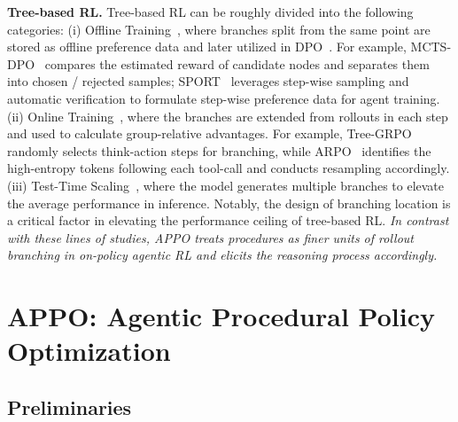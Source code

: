 \documentclass{llmxive}
\begin{document}
\noindent\textbf{Tree-based RL.}
Tree-based RL can be roughly divided into the following categories: (i) Offline Training~\cite{feng2023alphazero,lai2024step,li2025iterative,xie2024monte}, where  branches split from the same point are stored as offline preference data and later utilized in DPO~\cite{rafailov2023direct}. For example, MCTS-DPO~\cite{xie2024monte} compares the estimated reward of candidate nodes and separates them into chosen / rejected samples; SPORT~\cite{li2025iterative} leverages step-wise sampling and automatic verification to formulate step-wise preference data for agent training. (ii) Online Training~\cite{hou2025treerl,ji2025tree,dong2025agentic,dong2025agentic1,zhao2026training}, where the branches are extended from rollouts in each step and used to calculate group-relative advantages. For example, Tree-GRPO~\cite{ji2025tree} randomly selects think-action steps for branching, while ARPO~\cite{dong2025agentic} identifies the high-entropy tokens following each tool-call and conducts resampling accordingly. (iii) Test-Time Scaling~\cite{wang2026textbf,snell2024scaling,wu2024inference,welleck2024decoding,muennighoff2025s1}, where the model generates multiple branches to elevate the average performance in inference. Notably, the design of branching location is a critical factor in elevating the performance ceiling of tree-based RL.  \textit{In contrast with these lines of studies, APPO treats procedures as finer units of rollout branching in on-policy agentic RL and elicits the reasoning process accordingly. } 


 \section{APPO: Agentic Procedural Policy Optimization}

\subsection{Preliminaries}
\end{document}
